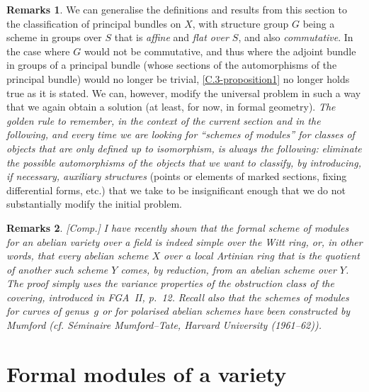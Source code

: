 \documentclass{article}
\theoremstyle{plain}
\theoremstyle{definition}
\newtheorem*{remarks*}{Remarks}
\newcommand{\oldpage}[1]{\marginpar{\footnotesize$\Big\vert$ \textit{p.~#1}}}
\begin{document}
\begin{remarks*}
  We can generalise the definitions and results from this section to the classification of principal bundles on $X$, with structure group $G$ being a scheme in groups over $S$ that is \emph{affine} and \emph{flat over $S$}, and also \emph{commutative}.
  In the case where $G$ would not be commutative, and thus where the adjoint bundle in groups of a principal bundle (whose sections of the automorphisms of the principal bundle) would no longer be trivial, \cref{C.3-proposition1} no longer holds true as it is stated.
  We can, however, modify the universal problem in such a way that we again obtain a solution (at least, for now, in formal geometry).
  \emph{The golden rule to remember, in the context of the current}
\oldpage{195-17}
  \emph{section and in the following, and every time we are looking for ``schemes of modules'' for classes of objects that are only defined up to isomorphism, is always the following:}
  \emph{eliminate the possible automorphisms of the objects that we want to classify, by introducing, if necessary, auxiliary structures} (points or elements of marked sections, fixing differential forms, etc.) that we take to be insignificant enough that we do not substantially modify the initial problem.
\end{remarks*}

\begin{remarks*}
  \emph{[Comp.]}
  \emph{I have recently shown that the formal scheme of modules for an abelian variety over a field is indeed simple over the Witt ring, or, in other words, that every abelian scheme $X$ over a local Artinian ring that is the quotient of another such scheme $Y$ comes, by reduction, from an abelian scheme over $Y$.}
  \emph{The proof simply uses the variance properties of the obstruction class of the covering, introduced in FGA~II, p.~12.}
  \emph{Recall also that the schemes of modules for curves of genus~$g$ or for polarised abelian schemes have been constructed by Mumford (cf. \emph{S\'{e}minaire Mumford--Tate}, Harvard University (1961--62)).}
\end{remarks*}


\section{Formal modules of a variety}
\label{C.4}
\end{document}
